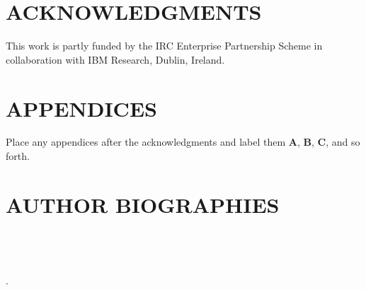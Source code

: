 \documentclass{wscpaperproc}
\theoremstyle{wsc}
\begin{document}
\section*{ACKNOWLEDGMENTS}
This work is partly funded by the IRC Enterprise Partnership Scheme in collaboration with IBM Research, Dublin, Ireland.

\appendix
\section{APPENDICES} \label{app:quadratic}
Place any appendices after the acknowledgments and label them
\textbf{A}, \textbf{B}, \textbf{C}, and so forth.





\section*{AUTHOR BIOGRAPHIES}
 \\
 \\
 \\
.


\end{document}
